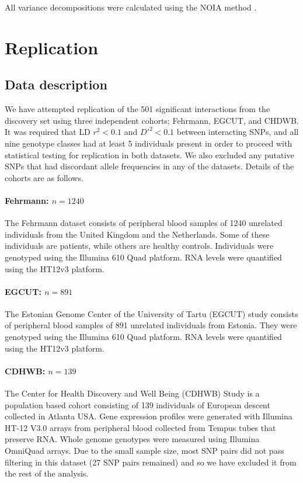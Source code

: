 \documentclass{article}
\begin{document}
All variance decompositions were calculated using the NOIA method \cite{Alvarez-Castro2008}.


\section{Replication}


\subsection{Data description}

We have attempted replication of the 501 significant interactions from the discovery set using three independent cohorts; Fehrmann, EGCUT, and CHDWB. It was required that LD $r^2 < 0.1$ and $D'^{2} < 0.1$ between interacting SNPs, and all nine genotype classes had at least 5 individuals present in order to proceed with statistical testing for replication in both datasets. We also excluded any putative SNPs that had discordant allele frequencies in any of the datasets. Details of the cohorts are as follows.

\paragraph{Fehrmann: $n=1240$}
The Fehrmann dataset \cite{Fehrmann2011} consists of peripheral blood samples of 1240 unrelated individuals from the United Kingdom and the Netherlands. Some of these individuals are patients, while others are healthy controls. Individuals were genotyped using the Illumina 610 Quad platform. RNA levels were quantified using the HT12v3 platform.

\paragraph{EGCUT: $n=891$}
The Estonian Genome Center of the University of Tartu (EGCUT) study \cite{Metspalu2004} consists of peripheral blood samples of 891 unrelated individuals from Estonia. They were genotyped using the Illumina 610 Quad platform. RNA levels were quantified using the HT12v3 platform.

\paragraph{CDHWB: $n=139$}
The Center for Health Discovery and Well Being (CDHWB) Study \cite{Preininger2013} is a population based cohort consisting of 139 individuals of European descent collected in Atlanta USA. Gene expression profiles were generated with Illumina HT-12 V3.0 arrays from peripheral blood collected from Tempus tubes that preserve RNA. Whole genome genotypes were measured using Illumina OmniQuad arrays. Due to the small sample size, most SNP pairs did not pass filtering in this dataset (27 SNP pairs remained) and so we have excluded it from the rest of the analysis.
\end{document}
